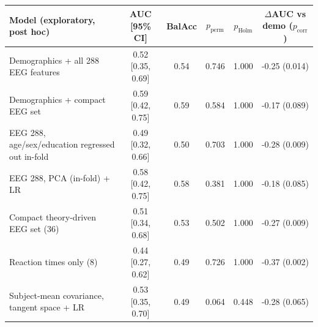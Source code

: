\begin{tabular}{@{}lccccc@{}}
\toprule
Model (exploratory, post hoc) & AUC [95\% CI] & BalAcc & $p_\text{perm}$ & $p_\text{Holm}$ & $\Delta$AUC vs demo ($p_\text{corr}$) \\
\midrule
Demographics + all 288 EEG features & 0.52 [0.35, 0.69] & 0.54 & 0.746 & 1.000 & -0.25 (0.014) \\
Demographics + compact EEG set & 0.59 [0.42, 0.75] & 0.59 & 0.584 & 1.000 & -0.17 (0.089) \\
EEG 288, age/sex/education regressed out in-fold & 0.49 [0.32, 0.66] & 0.50 & 0.703 & 1.000 & -0.28 (0.009) \\
EEG 288, PCA (in-fold) + LR & 0.58 [0.42, 0.75] & 0.58 & 0.381 & 1.000 & -0.18 (0.085) \\
Compact theory-driven EEG set (36) & 0.51 [0.34, 0.68] & 0.53 & 0.502 & 1.000 & -0.27 (0.009) \\
Reaction times only (8) & 0.44 [0.27, 0.62] & 0.49 & 0.726 & 1.000 & -0.37 (0.002) \\
Subject-mean covariance, tangent space + LR & 0.53 [0.35, 0.70] & 0.49 & 0.064 & 0.448 & -0.28 (0.065) \\
\bottomrule
\end{tabular}